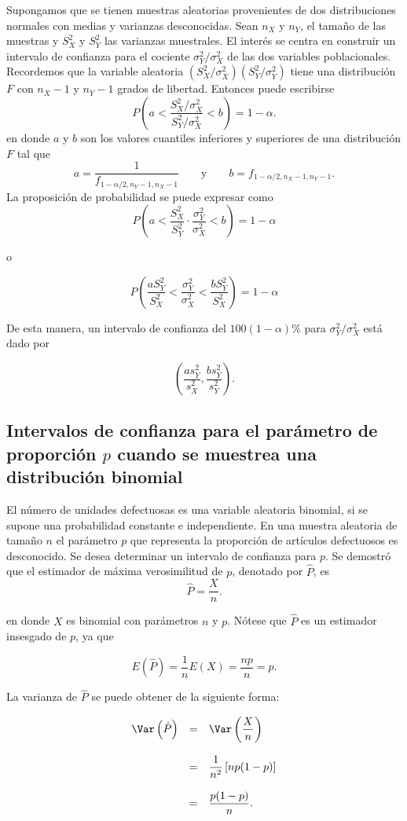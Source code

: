 Supongamos que se tienen muestras aleatorias provenientes de dos distribuciones normales con medias y varianzas desconocidas. Sean $n_X$ y $n_Y$, el tamaño de las muestras y $S_X^2$ y $S_Y^2$ las varianzas muestrales. El interés se centra en construir un intervalo de confianza para el cociente $\sigma_Y^2/\sigma_X^2$ de las dos variables poblacionales. Recordemos que la variable aleatoria $(S_X^2/\sigma_X^2)(S_Y^2/\sigma_Y^2)$ tiene una distribución $F$ con $n_X-1$ y $n_Y-1$ grados de libertad. Entonces puede escribirse
$$P\left(a<\dfrac{S_X^2/\sigma_X^2}{S_Y^2/\sigma_X^2}<b\right)=1-\alpha.$$
en donde $a$ y $b$ son los valores cuantiles inferiores y superiores de una distribución $F$ tal que 
$$a=\dfrac{1}{f_{1-\alpha/2,n_Y-1,n_X-1}}\qquad \mbox{y}\qquad b=f_{1-\alpha/2,n_X-1,n_Y-1}.$$
La proposición de probabilidad se puede expresar como
$$P\left(a<\dfrac{S_X^2}{S_Y^2}\cdot \dfrac{\sigma_Y^2}{\sigma_X^2}<b\right)=1-\alpha$$

o

$$P\left(\dfrac{aS_Y^2}{S_X^2}<\dfrac{\sigma_Y^2}{\sigma_X^2}<\dfrac{bS_Y^2}{S_X^2}\right)=1-\alpha$$

De esta manera, un intervalo de confianza del $100(1-\alpha)\%$ para $\sigma_Y^2/\sigma_X^2$ está dado por

$$\left(\dfrac{as_Y^2}{s_X^2},\dfrac{bs_Y^2}{s_Y^2}\right).$$

\subsection{Intervalos de confianza para el parámetro de proporción \boldmath $p$ cuando se muestrea una distribución binomial}
El número de unidades defectuosas es una variable aleatoria binomial, si se supone una probabilidad constante e independiente. En una muestra aleatoria de tamaño $n$ el parámetro $p$ que representa la proporción de artículos defectuosos es desconocido. Se desea determinar un intervalo de confianza para $p$. Se demostró que el estimador de máxima verosimilitud de $p$, denotado por $\hat{P}$, es
$$\hat{P}=\dfrac{X}{n}.$$

en donde $X$ es binomial con parámetros $n$ y $p$. Nótese que $\hat{P}$ es un estimador insesgado de $p$, ya que

$$E\left(\hat{P}\right)=\dfrac{1}{n} E(X)=\dfrac{np}{n}=p.$$

La varianza de $\hat{P}$ se puede obtener de la siguiente forma:

$$
\begin{array}{rcl}
    \Var\left(\hat{P}\right) &=& \Var\left(\dfrac{X}{n}\right)\\\\
			     &=& \dfrac{1}{n^2}\left[np(1-p)\right]\\\\
			     &=& \dfrac{p(1-p)}{n}.
\end{array}
$$

